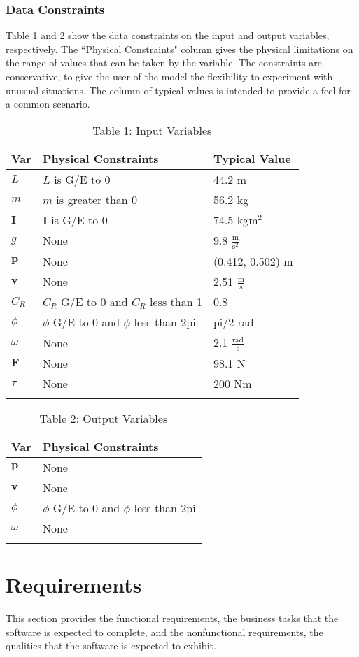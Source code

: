 \documentclass[12pt]{article}
\begin{document}
\subsubsection{Data Constraints}
\label{Sec:DC}
Table 1 and 2 show the data constraints on the input and output variables, respectively. The ``Physical Constraints" column gives the physical limitations on the range of values that can be taken by the variable. The constraints are conservative, to give the user of the model the flexibility to experiment with unusual situations. The column of typical values is intended to provide a feel for a common scenario.
\begin{longtable}{l l l}
\toprule
Var & Physical Constraints & Typical Value
\\
\midrule
$L$ & $L$ is G/E to 0 & 44.2 m
\\
$m$ & $m$ is greater than 0 & 56.2 kg
\\
$\mathbf{I}$ & $\mathbf{I}$ is G/E to 0 & 74.5 kg$\text{m}^{2}$
\\
$g$ & None & 9.8 $\frac{\text{m}}{\text{s}^{2}}$
\\
$\mathbf{p}$ & None & (0.412, 0.502) m
\\
$\mathbf{v}$ & None & 2.51 $\frac{\text{m}}{\text{s}}$
\\
$C_{R}$ & $C_{R}$ G/E to 0 and $C_{R}$ less than 1 & 0.8
\\
$\phi{}$ & $\phi{}$ G/E to 0 and $\phi{}$ less than 2pi & pi/2 rad
\\
$\omega{}$ & None & 2.1 $\frac{\text{rad}}{\text{s}}$
\\
$\mathbf{F}$ & None & 98.1 N
\\
$\tau{}$ & None & 200 Nm
\\
\bottomrule
\caption{Table 1: Input Variables}
\label{Table:T1IV}
\end{longtable}
\begin{longtable}{l l}
\toprule
Var & Physical Constraints
\\
\midrule
$\mathbf{p}$ & None
\\
$\mathbf{v}$ & None
\\
$\phi{}$ & $\phi{}$ G/E to 0 and $\phi{}$ less than 2pi
\\
$\omega{}$ & None
\\
\bottomrule
\caption{Table 2: Output Variables}
\label{Table:T2OV}
\end{longtable}
\section{Requirements}
\label{Sec:R}
This section provides the functional requirements, the business tasks that the software is expected to complete, and the nonfunctional requirements, the qualities that the software is expected to exhibit.
\end{document}
